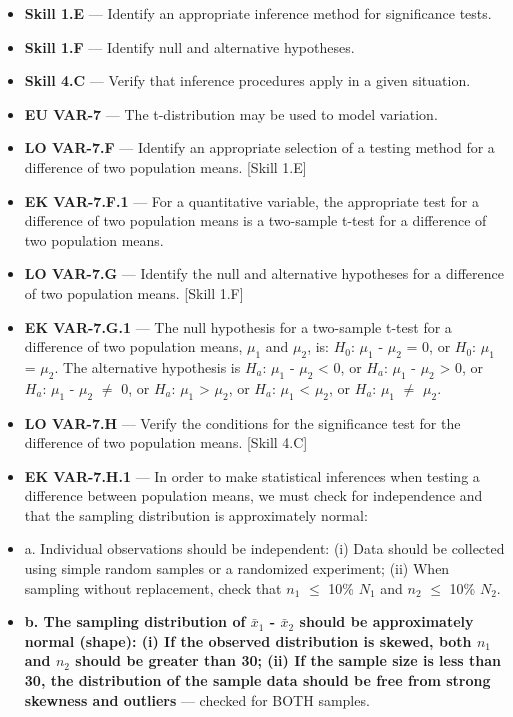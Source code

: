 \documentclass[11pt]{article}
\begin{document}


{\small
\begin{itemize}[leftmargin=1.5em,itemsep=2pt,topsep=2pt]
  \item \textbf{Skill 1.E} --- Identify an appropriate inference method for significance tests.
  \item \textbf{Skill 1.F} --- Identify null and alternative hypotheses.
  \item \textbf{Skill 4.C} --- Verify that inference procedures apply in a given situation.
  \item \textbf{EU VAR-7} --- The t-distribution may be used to model variation.
  \item \textbf{LO VAR-7.F} --- Identify an appropriate selection of a testing method for a difference of two population means. [Skill 1.E]
  \item \textbf{EK VAR-7.F.1} --- For a quantitative variable, the appropriate test for a difference of two population means is a two-sample t-test for a difference of two population means.
  \item \textbf{LO VAR-7.G} --- Identify the null and alternative hypotheses for a difference of two population means. [Skill 1.F]
  \item \textbf{EK VAR-7.G.1} --- The null hypothesis for a two-sample t-test for a difference of two population means, $\mu_1$ and $\mu_2$, is: $H_0$: $\mu_1$ - $\mu_2$ = 0, or $H_0$: $\mu_1$ = $\mu_2$. The alternative hypothesis is $H_a$: $\mu_1$ - $\mu_2$ < 0, or $H_a$: $\mu_1$ - $\mu_2$ > 0, or $H_a$: $\mu_1$ - $\mu_2$ $\neq$ 0, or $H_a$: $\mu_1$ > $\mu_2$, or $H_a$: $\mu_1$ < $\mu_2$, or $H_a$: $\mu_1$ $\neq$ $\mu_2$.
  \item \textbf{LO VAR-7.H} --- Verify the conditions for the significance test for the difference of two population means. [Skill 4.C]
  \item \textbf{EK VAR-7.H.1} --- In order to make statistical inferences when testing a difference between population means, we must check for independence and that the sampling distribution is approximately normal:
  \item a. Individual observations should be independent: (i) Data should be collected using simple random samples or a randomized experiment; (ii) When sampling without replacement, check that $n_1$ $\leq$ 10\% $N_1$ and $n_2$ $\leq$ 10\% $N_2$.
  \item \textbf{b. The sampling distribution of $\bar{x}_1$ - $\bar{x}_2$ should be approximately normal (shape): (i) If the observed distribution is skewed, both $n_1$ and $n_2$ should be greater than 30; (ii) If the sample size is less than 30, the distribution of the sample data should be free from strong skewness and outliers} --- checked for BOTH samples.
\end{itemize}
}
\end{document}
